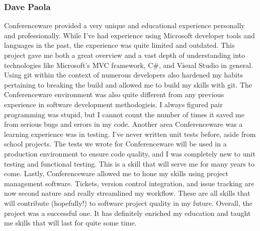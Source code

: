 \documentclass[12pt]{article}
\begin{document}
\subsubsection{Dave Paola}
Conferenceware provided a very unique and educational experience personally and professionally.  While I've had experience using Microsoft developer tools and languages in the past, the experience was quite limited and outdated.  This project gave me both a great overview and a vast depth of understanding into technologies like Microsoft's MVC framework, C\#, and Visual Studio in general.  Using git within the context of numerous developers also hardened my habits pertaining to breaking the build and allowed me to build my skills with git.  The Conferenceware environment was also quite different from any previous experience in software development methodogieis.  I always figured pair programming was stupid, but I cannot count the number of times it saved me from serious bugs and errors in my code.  Another area Conferenceware was a learning experience was in testing.  I've never written unit tests before, aside from school projects.  The tests we wrote for Conferenceware will be used in a production environment to ensure code quality, and I was completely new to unit testing and functional testing.  This is a skill that will serve me for many years to come.  Lastly, Conferenceware allowed me to hone my skills using project management software.  Tickets, version control integration, and issue tracking are now second nature and really streamlined my workflow.  These are all skills that will contribute (hopefully!) to software project quality in my future.  Overall, the project was a successful one.  It has definitely enriched my education and taught me skills that will last for quite some time.
\end{document}
